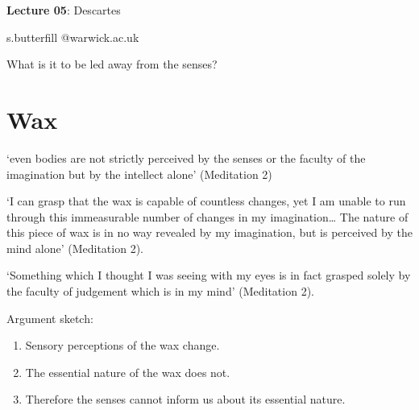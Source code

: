 \documentclass[12pt]{extarticle}
\date{}
\makeatletter
\def \ititle {Descartes}
\def \isubtitle {Lecture 02}
\def \iemail{s.butterfill @warwick.ac.uk}
\makeatother
\begin{document}
\begin{multicols*}{3}

\setlength\footnotesep{1em}











      
\def \ititle {Lecture 05}
 
\def \isubtitle {Descartes}
 
\begin{center}
 
{\Large
 
\textbf{\ititle}: \isubtitle
 
}
 
 
 
\iemail %
 
\end{center}


What is it to be led away from the senses?

 
\section{Wax}
 
‘even bodies are not strictly perceived by the senses or the faculty of the imagination but by the
intellect alone’
(Meditation 2)
 
‘I can grasp that the wax is capable of countless changes, yet I am unable to run through this
immeasurable number of changes in my imagination… The nature of this piece of wax is in no way
revealed by my imagination, but is perceived by the mind alone’
(Meditation 2).
 
‘Something which I thought I was seeing with my eyes is in fact grasped solely by the faculty of
judgement which is in my mind’
(Meditation 2).

Argument sketch:
\begin{enumerate}
\item Sensory perceptions of the wax change. 
\item The essential nature of the wax does not.
\item Therefore the senses cannot inform us about its essential nature.
\end{enumerate}


\end{multicols*}
\end{document}
